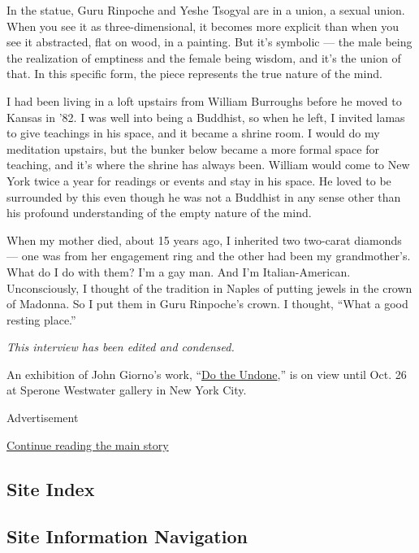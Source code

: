 In the statue, Guru Rinpoche and Yeshe Tsogyal are in a union, a sexual
union. When you see it as three-dimensional, it becomes more explicit
than when you see it abstracted, flat on wood, in a painting. But it's
symbolic --- the male being the realization of emptiness and the female
being wisdom, and it's the union of that. In this specific form, the
piece represents the true nature of the mind.

I had been living in a loft upstairs from William Burroughs before he
moved to Kansas in '82. I was well into being a Buddhist, so when he
left, I invited lamas to give teachings in his space, and it became a
shrine room. I would do my meditation upstairs, but the bunker below
became a more formal space for teaching, and it's where the shrine has
always been. William would come to New York twice a year for readings or
events and stay in his space. He loved to be surrounded by this even
though he was not a Buddhist in any sense other than his profound
understanding of the empty nature of the mind.

When my mother died, about 15 years ago, I inherited two two-carat
diamonds --- one was from her engagement ring and the other had been my
grandmother's. What do I do with them? I'm a gay man. And I'm
Italian-American. Unconsciously, I thought of the tradition in Naples of
putting jewels in the crown of Madonna. So I put them in Guru Rinpoche's
crown. I thought, ``What a good resting place.''

\emph{This interview has been edited and condensed.}

An exhibition of John Giorno's work,
``\href{https://www.speronewestwater.com/exhibitions/john-giorno/installations}{Do
the Undone},'' is on view until Oct. 26 at Sperone Westwater gallery in
New York City.

Advertisement

\protect\hyperlink{after-bottom}{Continue reading the main story}

\hypertarget{site-index}{%
\subsection{Site Index}\label{site-index}}

\hypertarget{site-information-navigation}{%
\subsection{Site Information
Navigation}\label{site-information-navigation}}

